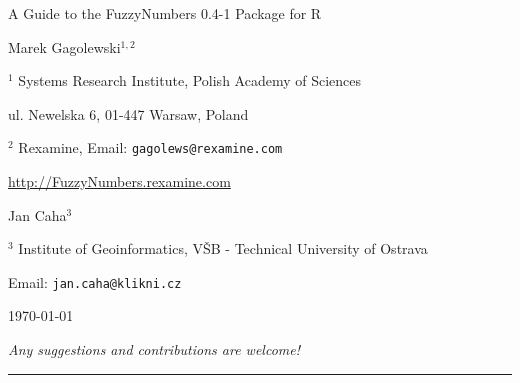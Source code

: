 \documentclass[11pt]{article}\usepackage[]{graphicx}\usepackage[]{color}
\newcommand{\package}[1]{\textsf{#1}\xspace}
\newcommand{\lang}[1]{\textsf{#1}\xspace}
\newcommand{\R}{\lang{R}}
\begin{document}



\begin{center}
{\LARGE\sf A Guide to the \package{FuzzyNumbers} {0.4-1} Package for \R}

\bigskip
{\large Marek Gagolewski${}^{1,2}$}

${}^{1}$ Systems Research Institute, Polish Academy of Sciences

ul. Newelska 6, 01-447 Warsaw, Poland

${}^{2}$ Rexamine, Email: \texttt{gagolews@rexamine.com}

\href{http://FuzzyNumbers.rexamine.com/}%
{http://FuzzyNumbers.rexamine.com}

{\large Jan Caha${}^{3}$}

${}^{3}$ Institute of Geoinformatics, VŠB - Technical University of Ostrava

Email: \texttt{jan.caha@klikni.cz}

\bigskip
\today



\medskip
\textit{Any suggestions and contributions are welcome!}
\end{center}





\bigskip\hrule\bigskip
\tableofcontents




\end{document}
